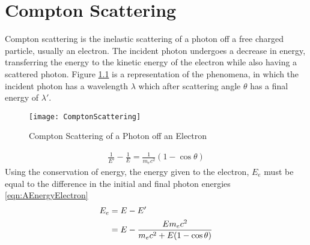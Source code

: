 \chapter{Compton Scattering}
\label{chap:ComptonScatter}

Compton scattering is the inelastic scattering of a photon off a free charged particle, usually an electron.
The incident photon undergoes a decrease in energy, transferring the energy to the kinetic energy of the electron while also having a scattered photon.
Figure \ref{fig:ComptonScattering} is a representation of the phenomena, in which the incident photon has a wavelength $\lambda$ which after scattering angle $\theta$ has a final energy of $\lambda'$.
\begin{figure}
  \centering
  \texttt{[image: ComptonScattering]}
  \caption{Compton Scattering of a Photon off an Electron}
  \label{fig:ComptonScattering}
\end{figure}
\begin{align}
  \label{eqn:AFinalPhotonEnergy}
  \frac{1}{E'} -\frac{1}{E} = \frac{1}{m_e c^2}\left(1-\cos\theta\right) 
\end{align}
Using the conservation of energy, the energy given to the electron, $E_e$ must be equal to the difference in the initial and final photon energies \eqref{eqn:AEnergyElectron}
\begin{align}
  \label{eqn:AEnergyElectron}
  E_e &= E - E' \\ \notag
   &= E - \frac{E m_e c^2}{m_e c^2 + E (1-\cos\theta)}
\end{align}

